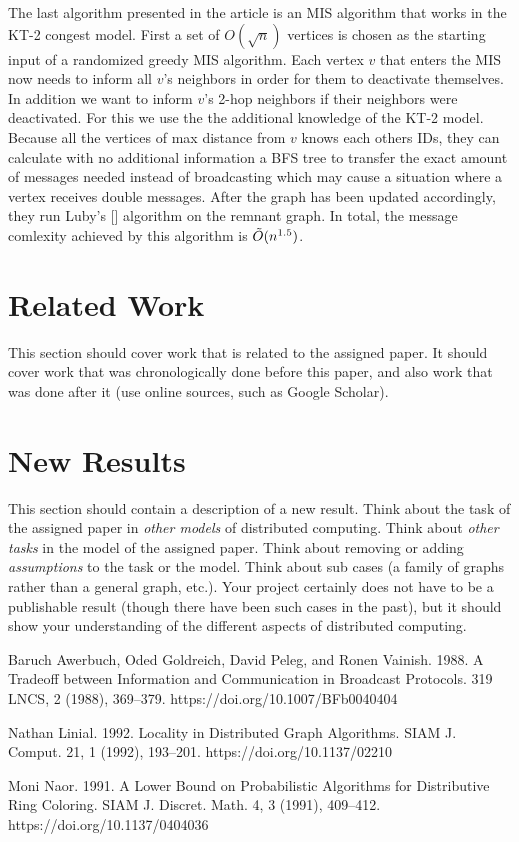\documentclass[11pt]{article}
\begin{document}
\newline The last algorithm presented in the article is an MIS algorithm that works in the KT-2 congest model. First a set of $O(\sqrt{n})$ vertices is chosen as the starting input of a randomized greedy MIS algorithm. Each vertex $v$ that enters the MIS now needs to inform all $v$'s neighbors in order for them to deactivate themselves. In addition we want to inform $v$'s 2-hop neighbors if their neighbors were deactivated. For this we use the the additional knowledge of the KT-2 model. Because all the vertices of max distance from $v$ knows each others IDs, they can calculate with no additional information a BFS tree to transfer the exact amount of messages needed instead of broadcasting which may cause a situation where a vertex receives double messages. After the graph has been updated accordingly, they run Luby's [] algorithm on the remnant graph. In total, the message comlexity achieved by this algorithm is $\Tilde{O}(n^{1.5})$.

\section{Related Work}
This section should cover work that is related to the assigned paper. It should cover work that was chronologically done before this paper, and also work that was done after it (use online sources, such as Google Scholar).
\section{New Results}
This section should contain a description of a new result. Think about the task of the assigned paper in \emph{other models} of distributed computing. Think about \emph{other tasks} in the model of the assigned paper. Think about removing or adding \emph{assumptions} to the task or the model. Think about sub cases (a family of graphs rather than a general graph, etc.). Your project certainly does not have to be a publishable result (though there have been such cases in the past), but it should show your understanding of the different aspects of distributed computing.




\begin{thebibliography}{9}
Baruch Awerbuch, Oded Goldreich, David Peleg, and Ronen Vainish. 1988. A Tradeoff between Information and Communication in Broadcast
Protocols. 319 LNCS, 2 (1988), 369–379. https://doi.org/10.1007/BFb0040404

Nathan Linial. 1992. Locality in Distributed Graph Algorithms. SIAM J. Comput. 21, 1 (1992), 193–201. https://doi.org/10.1137/02210

Moni Naor. 1991. A Lower Bound on Probabilistic Algorithms for Distributive Ring Coloring. SIAM J. Discret. Math. 4, 3 (1991), 409–412.
https://doi.org/10.1137/0404036

\end{thebibliography}
\end{document}
